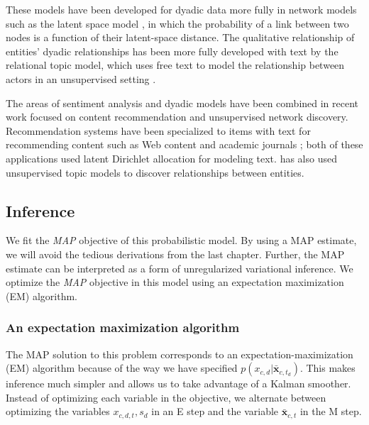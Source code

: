 These models have been developed for dyadic data more fully in network
models such as the latent space model \citep{hoff:2002,sarkar:2005}, in
which the probability of a link between two nodes is a function of
their latent-space distance.  The qualitative relationship of
entities' dyadic relationships has been more fully developed with text
by the relational topic model, which uses free text to model the
relationship between actors in an unsupervised setting
\citep{chang:2009}.

The areas of sentiment analysis and dyadic models have been combined
in recent work focused on content recommendation and unsupervised
network discovery.  Recommendation systems have been specialized to
items with text for recommending content such as Web content
\citep{agarwal:2010} and academic journals \citep{wang:2011}; both of
these applications used latent Dirichlet allocation for modeling text.
\cite{chang:2009} has also used unsupervised topic models to discover
relationships between entities.



\subsection{Inference}
\label{sec:fr_inference}
We fit the \emph{MAP} objective of this probabilistic model.  By using
a MAP estimate, we will avoid the tedious derivations from the last
chapter.  Further, the MAP estimate can be interpreted as a form of
unregularized variational inference.  We optimize the \emph{MAP}
objective in this model using an expectation maximization (EM)
algorithm.

\subsubsection{An expectation maximization algorithm}
The MAP solution to this problem corresponds to an
expectation-maximization (EM) algorithm because of the way we have
specified $p(x_{c,d} | \bm \bar x_{c, t_d})$.  This makes inference
much simpler and allows us to take advantage of a Kalman smoother.
Instead of optimizing each variable in the objective, we alternate
between optimizing the variables $x_{c,d,t}, s_d$ in an E step and the
variable $\bm \bar x_{c,t}$ in the M step.

